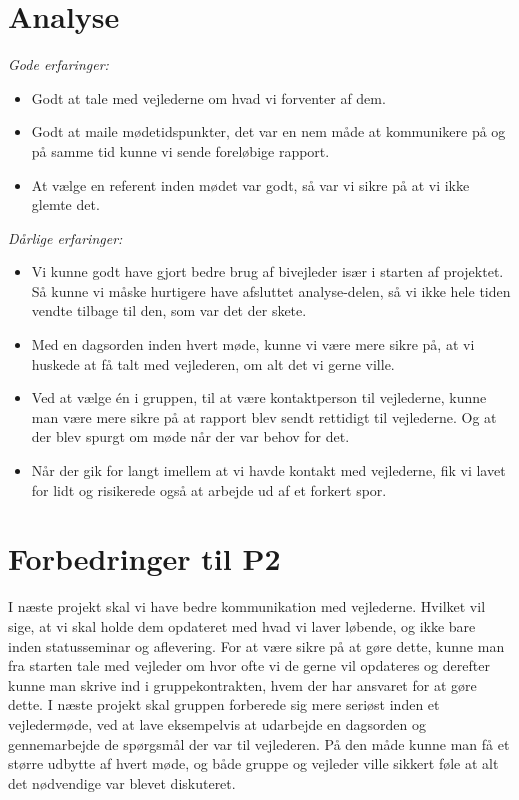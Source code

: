 \section{Analyse}

\emph{Gode erfaringer:}
\begin{itemize}
\item	Godt at tale med vejlederne om hvad vi forventer af dem.

\item Godt at maile mødetidspunkter, det var en nem måde at kommunikere på og på samme tid kunne vi sende foreløbige rapport.

\item At vælge en referent inden mødet var godt, så var vi sikre på at vi ikke glemte det.
\end{itemize}\emph{Dårlige erfaringer:}
\begin{itemize}
\item	Vi kunne godt have gjort bedre brug af bivejleder især i starten af projektet. Så kunne vi måske hurtigere have afsluttet analyse-delen, så vi ikke hele tiden vendte tilbage til den, som var det der skete.

\item	Med en dagsorden inden hvert møde, kunne vi være mere sikre på, at vi huskede at få talt med vejlederen, om alt det vi gerne ville.

\item	Ved at vælge én i gruppen, til at være kontaktperson til vejlederne, kunne man være mere sikre på at rapport blev sendt rettidigt til vejlederne. Og at der blev spurgt om møde når der var behov for det.

\item	Når der gik for langt imellem at vi havde kontakt med vejlederne, fik vi lavet for lidt og risikerede også at arbejde ud af et forkert spor.
\end{itemize}

\section{Forbedringer til P2}

I næste projekt skal vi have bedre kommunikation med vejlederne. Hvilket vil sige, at vi skal holde dem opdateret med hvad vi laver løbende, og ikke bare inden statusseminar og aflevering. For at være sikre på at gøre dette, kunne man fra starten tale med vejleder om hvor ofte vi de gerne vil opdateres og derefter kunne man skrive ind i gruppekontrakten, hvem der har ansvaret for at gøre dette. 
I næste projekt skal gruppen forberede sig mere seriøst inden et vejledermøde, ved at lave eksempelvis at udarbejde en dagsorden og gennemarbejde de spørgsmål der var til vejlederen. På den måde kunne man få et større udbytte af hvert møde, og både gruppe og vejleder ville sikkert føle at alt det nødvendige var blevet diskuteret. 
